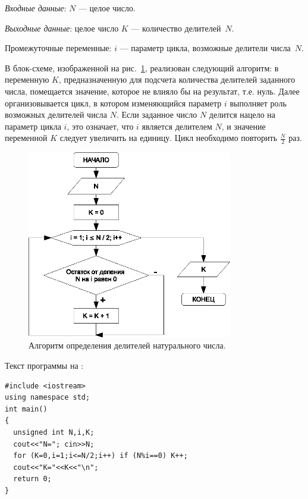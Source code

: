
\emph{Входные данные}: $N$ --- целое число.

\emph{Выходные данные}: целое число $K$ --- количество делителей~$N$.

Промежуточные переменные: $i$ --- параметр цикла, возможные делители числа~$N$.

В блок-схеме, изображенной на рис.~\ref{ch03:refDrawing30}, реализован следующий алгоритм: в переменную $K$,
предназначенную для подсчета количества делителей заданного числа, помещается значение, которое не влияло бы на
результат, т.е. нуль. Далее организовывается цикл, в котором изменяющийся параметр $i$ выполняет роль
возможных делителей числа $N$. Если заданное число $N$ делится нацело на параметр цикла $i$, это
означает, что $i$ является делителем $N$, и значение переменной $K$
следует увеличить на единицу. Цикл необходимо повторить $\frac{N}{2}$ раз.

\begin{figure}[htb]
\begin{center}
\includegraphics[width=0.8\textwidth]{img/ris_3_31}
\caption{Алгоритм определения делителей натурального числа.}
\label{ch03:refDrawing30}
\end{center}
\end{figure}

Текст программы на :
\begin{lstlisting}
#include <iostream>
using namespace std;
int main()
{
  unsigned int N,i,K;
  cout<<"N="; cin>>N;
  for (K=0,i=1;i<=N/2;i++) if (N%i==0) K++;
  cout<<"K="<<K<<"\n";
  return 0;
}
\end{lstlisting}

